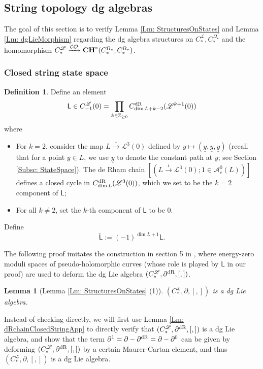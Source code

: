 \documentclass[10pt]{amsart}
\numberwithin{equation}{section}
\theoremstyle{plain}
\newtheorem{lemma}[theorem]{Lemma}
\theoremstyle{definition}
\newtheorem{definition}[theorem]{Definition}
\theoremstyle{remark}
\numberwithin{equation}{section}
\newcommand{\Z}{\mathbb{Z}}
\newcommand{\wt}[1]{\widetilde{#1}}
\newcommand{\dR}{\textup{dR}}
\newcommand{\CO}{\mathcal{CO}}
\newcommand{\CC}{\textbf{\textup{CH}}}
\newcommand{\CFr}{C_*^\mathscr{L}}
\newcommand{\CBa}{C_*^{\Omega_\star}}
\newcommand{\Cfr}[1]{C_{#1}^\mathscr{L}}
\newcommand{\LL}{\textsf{L}}
\begin{document}
{\subsection{String topology dg algebras}\label{Subsc: dgAlgebraSignApp}

The goal of this section is to verify Lemma \ref{Lm: StructuresOnStates} and Lemma \ref{Lm: dgLieMorphism} regarding the dg algebra structures on $\CFr,\CBa$ and the homomorphism $\CFr\xrightarrow{\CO} \CC^*(\CBa,\CBa)$.



\subsubsection{Closed string state space}\label{Subsubsc: AppClosedState}


\begin{definition}\label{Defn: SpecialEltLL}
	Define an element
	\[ \LL \in \Cfr{-1}(0) = \prod_{k\in \Z_{\geq 0}} C^\dR_{\dim L + k - 2} (\mathscr{L}^{k+1}(0))\]
where 
\begin{itemize}
	\item For $k=2$, consider the map $L\xrightarrow{\iota} \mathscr{L}^3 (0)$ defined by $y \mapsto (\underline{y},\underline{y},\underline{y})$  (recall that for a point $y \in L$, we use $\underline{y}$ to denote the constant path at $y$; see Section \ref{Subsc: StateSpace}). The de Rham chain $[(L\xrightarrow{\iota} \mathscr{L}^3 (0); 1\in \mathscr{A}_c^0(L))]$ defines a closed cycle in $C^\dR_{\dim L}(\mathscr{L}^3(0))$, which we set to be the $k=2$ component of $\LL$; 
	\item For all $k\neq 2$, set the $k$-th component of $\LL$ to be 0.
\end{itemize}
	Define \[ \wt{\LL}:= (-1)^{\dim L + 1} \LL. \]
\end{definition}


The following proof imitates the construction in section 5 in \cite{Irie2}, where energy-zero moduli spaces of pseudo-holomorphic curves (whose role is played by $\LL$ in our proof) are used to deform the dg Lie algebra $(\CFr,\partial^\dR, [,])$.

\begin{lemma}[Lemma \ref{Lm: StructuresOnStates} (1)]\label{Lm: StructuresOnClosedStatesApp}
		$(\CFr, \partial, [,])$ is a dg Lie algebra.
\end{lemma}



Instead of checking directly, we will first use Lemma \ref{Lm: dRchainClosedStringApp} to directly verify that $(\CFr, \partial^\dR, [,])$ is a dg Lie algebra, and show that the term $\partial^1 = \partial - \partial^\dR=\partial - \partial^0$ can be given by deforming $(\CFr, \partial^\dR, [,])$ by a certain Maurer-Cartan element, and thus $(\CFr, \partial,[,])$ is a dg Lie algebra.

}
\end{document}
